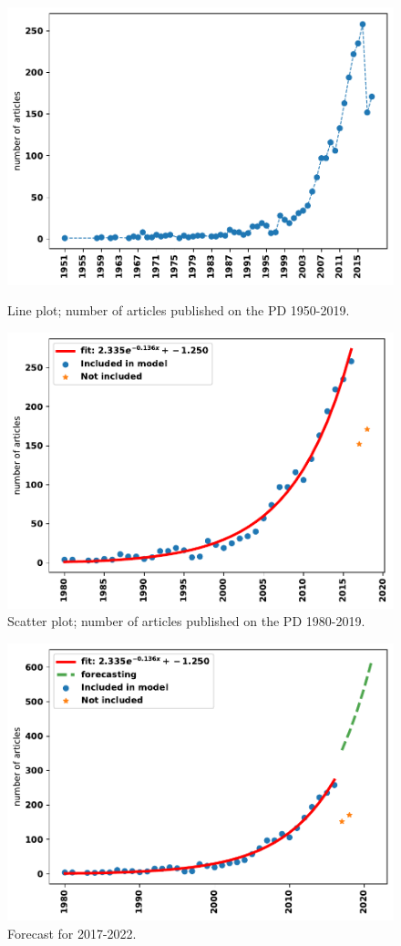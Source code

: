 \documentclass{article}
\theoremstyle{definition}
\begin{document}
\begin{figure}[!hbtp]
\begin{minipage}{.45\textwidth}
    \centering
    \includegraphics[width=.9\textwidth]{./assets/images/timeline.pdf}
    \caption{Line plot; number of articles published on the PD 1950-2019.}\label{fig:timeseries}
\end{minipage}
\begin{minipage}{.45\textwidth}
    \centering
    \includegraphics[width=.9\textwidth]{./assets/images/fitting.pdf}
    \caption{Scatter plot; number of articles published on the PD 1980-2019.}\label{fig:fitting}
\end{minipage}
\end{figure}

\begin{figure}[!hbtp]
    \centering
    \includegraphics[width=.45\textwidth]{./assets/images/forecasting.pdf}
    \caption{Forecast for 2017-2022.}\label{fig:forecasting}
\end{figure}
\end{document}
